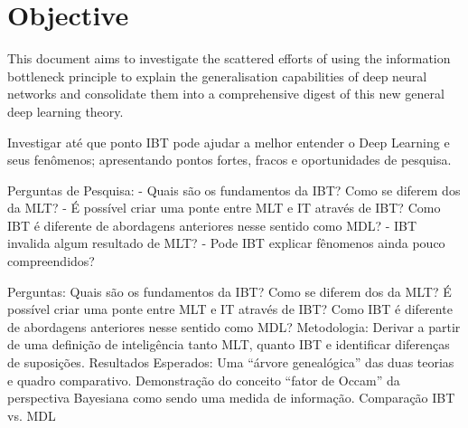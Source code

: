 

\section{Objective}

This document aims to investigate the scattered efforts of using the information bottleneck principle to explain the generalisation capabilities of deep neural networks and consolidate them into a comprehensive digest of this new general deep learning theory.

Investigar até que ponto  IBT pode ajudar a melhor entender o Deep Learning e seus fenômenos; apresentando pontos fortes, fracos e oportunidades de pesquisa.

Perguntas de Pesquisa:
- Quais são os fundamentos da IBT? Como se diferem dos da MLT?
- É possível criar uma ponte entre MLT e IT através de IBT? Como IBT é diferente de abordagens anteriores nesse sentido como MDL?
- IBT invalida algum resultado de MLT?
- Pode IBT explicar fênomenos ainda pouco compreendidos?

Perguntas:
Quais são os fundamentos da IBT? Como se diferem dos da MLT?
É possível criar uma ponte entre MLT e IT através de IBT? Como IBT é diferente de abordagens anteriores nesse sentido como MDL?
Metodologia:
Derivar a partir de uma definição de inteligência tanto MLT, quanto IBT e identificar diferenças de  suposições.
Resultados Esperados:
Uma “árvore genealógica” das duas teorias e quadro comparativo.
Demonstração do conceito “fator de Occam” da perspectiva Bayesiana como sendo uma medida de informação.
Comparação IBT vs. MDL

